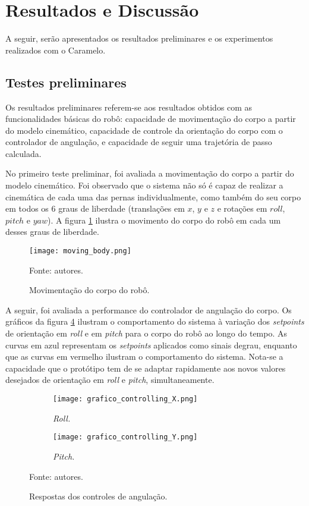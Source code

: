 \documentclass[conference]{IEEEtran}
\begin{document}
\section{Resultados e Discussão}
A seguir, serão apresentados os resultados preliminares e os experimentos realizados com o Caramelo. 
  
  \subsection{Testes preliminares}
  \label{subsec:testes_preliminares}
  
  Os resultados preliminares referem-se aos resultados obtidos com as funcionalidades básicas do robô: capacidade de movimentação do corpo a partir do modelo cinemático, capacidade de controle da orientação do corpo com o controlador de angulação, e capacidade de seguir uma trajetória de passo calculada.

  No primeiro teste preliminar, foi avaliada a movimentação do corpo a partir do modelo cinemático. Foi observado que o sistema não só é capaz de realizar a cinemática de cada uma das pernas individualmente, como também do seu corpo em todos os 6 graus de liberdade (translações em $x$, $y$ e $z$ e rotações em $roll$, $pitch$ e $yaw$). A figura \ref{fig:moving_body} ilustra o movimento do corpo do robô em cada um desses graus de liberdade.

  \begin{figure}[!htb]
    \centering
    \texttt{[image: moving\_body.png]}
    \caption{Movimentação do corpo do robô.}
    Fonte: autores.
    \label{fig:moving_body}
  \end{figure}

  A seguir, foi avaliada a performance do controlador de angulação do corpo. Os gráficos da figura \ref{fig:grafico_controlling} ilustram o comportamento do sistema à variação dos \textit{setpoints} de orientação em \textit{roll} e em \textit{pitch} para o corpo do robô ao longo do tempo. As curvas em azul representam os \textit{setpoints} aplicados como sinais degrau, enquanto que as curvas em vermelho ilustram o comportamento do sistema. Nota-se a capacidade que o protótipo tem de se adaptar rapidamente aos novos valores desejados de orientação em \textit{roll} e \textit{pitch}, simultaneamente.

  \begin{figure}
    \centering
    \begin{subfigure}[t]{0.48\textwidth}
      \centering
      \texttt{[image: grafico\_controlling\_X.png]}
      \caption{\textit{Roll.}}
      \label{fig:controlling_roll}
    \end{subfigure}
    \begin{subfigure}[t]{0.48\textwidth}
      \centering
      \texttt{[image: grafico\_controlling\_Y.png]}
      \caption{\textit{Pitch.}}
      \label{fig:controlling_pitch}
    \end{subfigure}
    \caption{Respostas dos controles de angulação.}
    Fonte: autores.
    \label{fig:grafico_controlling}
  \end{figure}
\end{document}
